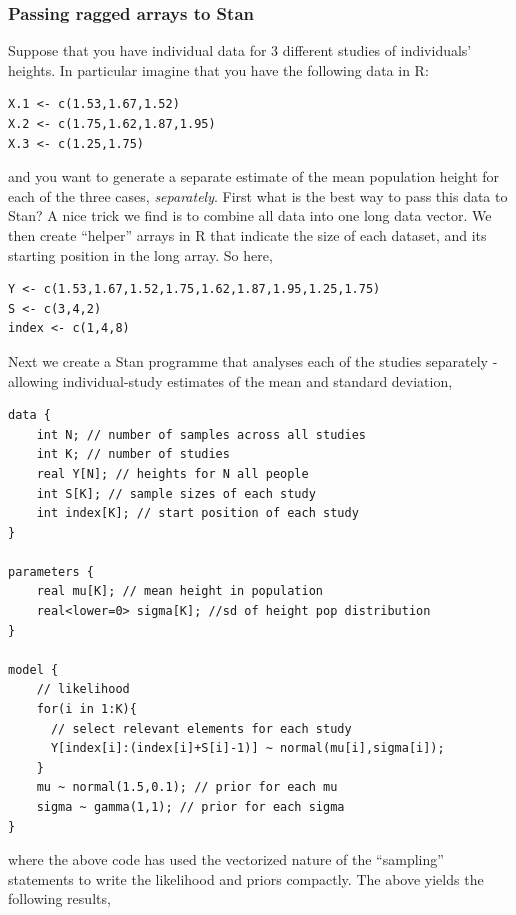 \documentclass[11pt,fullpage]{book}
\begin{document}
\subsubsection{Passing ragged arrays to Stan}
Suppose that you have individual data for 3 different studies of individuals' heights. In particular imagine that you have the following data in R:

\begin{verbatim}
X.1 <- c(1.53,1.67,1.52)
X.2 <- c(1.75,1.62,1.87,1.95)
X.3 <- c(1.25,1.75)
\end{verbatim}

and you want to generate a separate estimate of the mean population height for each of the three cases, \textit{separately}. First what is the best way to pass this data to Stan? A nice trick we find is to combine all data into one long data vector. We then create ``helper'' arrays in R that indicate the size of each dataset, and its starting position in the long array. So here,

\begin{verbatim}
Y <- c(1.53,1.67,1.52,1.75,1.62,1.87,1.95,1.25,1.75)
S <- c(3,4,2)
index <- c(1,4,8)
\end{verbatim}

Next we create a Stan programme that analyses each of the studies separately - allowing individual-study estimates of the mean and standard deviation,

\begin{verbatim}
data {
    int N; // number of samples across all studies
    int K; // number of studies
    real Y[N]; // heights for N all people
    int S[K]; // sample sizes of each study
    int index[K]; // start position of each study
}

parameters {
    real mu[K]; // mean height in population
    real<lower=0> sigma[K]; //sd of height pop distribution
}

model {
    // likelihood
    for(i in 1:K){
      // select relevant elements for each study
      Y[index[i]:(index[i]+S[i]-1)] ~ normal(mu[i],sigma[i]);
    }
    mu ~ normal(1.5,0.1); // prior for each mu
    sigma ~ gamma(1,1); // prior for each sigma
}
\end{verbatim}
where the above code has used the vectorized nature of the ``sampling'' statements to write the likelihood and priors compactly. The above yields the following results,
\end{document}
